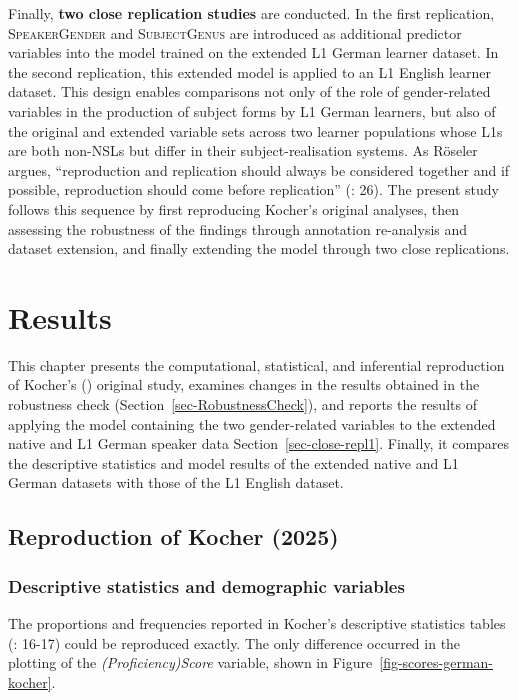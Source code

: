 \documentclass[
  letterpaper,
  DIV=11,
  numbers=noendperiod]{scrartcl}
\begin{document}
Finally, \textbf{two close replication studies} are conducted. In the
first replication, \textsc{SpeakerGender} and \textsc{SubjectGenus} are
introduced as additional predictor variables into the model trained on
the extended L1 German learner dataset. In the second replication, this
extended model is applied to an L1 English learner dataset. This design
enables comparisons not only of the role of gender-related variables in
the production of subject forms by L1 German learners, but also of the
original and extended variable sets across two learner populations whose
L1s are both non-NSLs but differ in their subject-realisation systems.
As Röseler argues, ``reproduction and replication should always be
considered together and if possible, reproduction should come before
replication'' (: 26). The present
study follows this sequence by first reproducing Kocher's original
analyses, then assessing the robustness of the findings through
annotation re-analysis and dataset extension, and finally extending the
model through two close replications.

\section{Results}\label{sec-Results}

This chapter presents the computational, statistical, and inferential
reproduction of Kocher's ()
original study, examines changes in the results obtained in the
robustness check (Section~\ref{sec-RobustnessCheck}), and reports the
results of applying the model containing the two gender-related
variables to the extended native and L1 German speaker data
Section~\ref{sec-close-repl1}. Finally, it compares the descriptive
statistics and model results of the extended native and L1 German
datasets with those of the L1 English dataset.

\subsection{Reproduction of Kocher
(2025)}\label{sec-results-reproduction}

\subsubsection{Descriptive statistics and demographic
variables}\label{descriptive-statistics-and-demographic-variables}

The proportions and frequencies reported in Kocher's descriptive
statistics tables (: 16-17)
could be reproduced exactly. The only difference occurred in the
plotting of the \emph{(Proficiency)Score} variable, shown in
Figure~\ref{fig-scores-german-kocher}.
\end{document}

